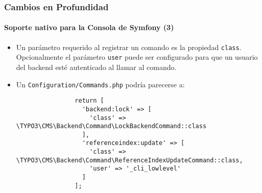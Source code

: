 \begin{frame}[fragile]
	\frametitle{Cambios en Profundidad}
	\framesubtitle{Soporte nativo para la Consola de Symfony (3)}

	\lstset{basicstyle=\tiny\ttfamily}

	\begin{itemize}

		\item Un parámetro requerido al registrar un comando es la propiedad \texttt{class}.
			Opcionalmente el parámetro \texttt{user} puede ser configurado para que un usuario del backend esté autenticado
			al llamar al comando.

		\item Un \texttt{Configuration/Commands.php} podría parecerse a:

			\begin{lstlisting}
				return [
				  'backend:lock' => [
				    'class' => \TYPO3\CMS\Backend\Command\LockBackendCommand::class
				  ],
				  'referenceindex:update' => [
				    'class' => \TYPO3\CMS\Backend\Command\ReferenceIndexUpdateCommand::class,
				    'user' => '_cli_lowlevel'
				  ]
				];
			\end{lstlisting}

	\end{itemize}

\end{frame}

